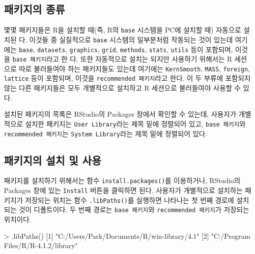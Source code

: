 \documentclass[
]{book}
\newenvironment{Shaded}{\begin{snugshade}}{\end{snugshade}}
\newcommand{\DecValTok}[1]{\textcolor[rgb]{0.00,0.00,0.81}{#1}}
\newcommand{\FunctionTok}[1]{\textcolor[rgb]{0.00,0.00,0.00}{#1}}
\newcommand{\NormalTok}[1]{#1}
\newcommand{\SpecialCharTok}[1]{\textcolor[rgb]{0.00,0.00,0.00}{#1}}
\newcommand{\StringTok}[1]{\textcolor[rgb]{0.31,0.60,0.02}{#1}}
\begin{document}
\hypertarget{uxd328uxd0a4uxc9c0uxc758-uxc885uxb958}{%
\subsection{패키지의 종류}\label{uxd328uxd0a4uxc9c0uxc758-uxc885uxb958}}

몇몇 패키지들은 R을 설치할 때(즉, R의 \texttt{base} 시스템을 PC에 설치할 때)
자동으로 설치된 다. 이것들 중 실질적으로 \texttt{base} 시스템의 일부분처럼
작동되는 것이 있는데 여기에는 \texttt{base}, \texttt{datasets}, \texttt{graphics}, \texttt{grid}, \texttt{methods},
\texttt{stats}, \texttt{utils} 등이 포함되며, 이것을 \texttt{base\ 패키지}라고 한 다. 또한
자동적으로 설치는 되지만 사용하기 위해서는 R 세션으로 따로 불러들여야
하는 패키지들도 있는데 여기에는 \texttt{KernSmooth}, \texttt{MASS}, \texttt{foreign}, \texttt{lattice} 등이
포함되며, 이것을 \texttt{recommended\ 패키지}라고 한다. 이 두 부류에 포함되지
않는 다른 패키지들은 모두 개별적으로 설치하고 R 세션으로 불러들여야
사용할 수 있다.

설치된 패키지의 목록은 RStudio의 Packages 창에서 확인할 수 있는데,
사용자가 개별적으로 설치한 패키지는 \texttt{User\ Library}라는 제목 밑에 정렬되어
있고, \texttt{base\ 패키지}와 \texttt{recommended\ 패키지}는 \texttt{System\ Library}라는 제목 밑에
정렬되어 있다.

\hypertarget{uxd328uxd0a4uxc9c0uxc758-uxc124uxce58-uxbc0f-uxc0acuxc6a9}{%
\subsection{패키지의 설치 및 사용}\label{uxd328uxd0a4uxc9c0uxc758-uxc124uxce58-uxbc0f-uxc0acuxc6a9}}

패키지를 설치하기 위해서는 함수 \texttt{install.packages()}를 이용하거나,
RStudio의 Packages 창에 있는 \texttt{Install} 버튼을 클릭하면 된다.
사용자가 개별적으로 설치하는 패키지가 저장되는 위치는 함수 \texttt{.libPaths()}를 실행하면 나타나는 첫 번째
경로에 설치되는 것이 디폴트이다.
두 번째 경로는 \texttt{base\ 패키지}와 \texttt{recommended\ 패키지}가 저장되는 위치이다.

\begin{Shaded}
\begin{Highlighting}[]
\SpecialCharTok{\textgreater{}} \FunctionTok{.libPaths}\NormalTok{()}
\NormalTok{[}\DecValTok{1}\NormalTok{] }\StringTok{"C:/Users/Park/Documents/R/win{-}library/4.1"}
\NormalTok{[}\DecValTok{2}\NormalTok{] }\StringTok{"C:/Program Files/R/R{-}4.1.2/library"}       
\end{Highlighting}
\end{Shaded}
\end{document}
